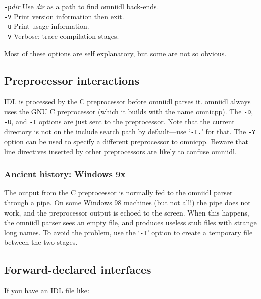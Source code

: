 \documentclass[11pt,twoside,a4paper]{book}
\newcommand{\cmdline}[1]{\texttt{#1}}
\begin{document}
\begin{tabbing}
\cmdline{-p}\textit{dir}
     \> Use \textit{dir} as a path to find omniidl back-ends.\\

\cmdline{-V}
     \> Print version information then exit.\\

\cmdline{-u}
     \> Print usage information.\\

\cmdline{-v}
     \> Verbose: trace compilation stages.\\

\end{tabbing}

\noindent Most of these options are self explanatory, but some are not
so obvious.

\subsection{Preprocessor interactions}

IDL is processed by the C preprocessor before omniidl parses it.
omniidl always uses the GNU C preprocessor (which it builds with the
name omnicpp). The \cmdline{-D}, \cmdline{-U}, and \cmdline{-I}
options are just sent to the preprocessor. Note that the current
directory is not on the include search path by default---use
`\cmdline{-I.}' for that. The \cmdline{-Y} option can be used to
specify a different preprocessor to omnicpp. Beware that line
directives inserted by other preprocessors are likely to confuse
omniidl.

\subsubsection{Ancient history: Windows 9x}

The output from the C preprocessor is normally fed to the omniidl
parser through a pipe. On some Windows 98 machines (but not all!)  the
pipe does not work, and the preprocessor output is echoed to the
screen. When this happens, the omniidl parser sees an empty file, and
produces useless stub files with strange long names. To avoid the
problem, use the `\cmdline{-T}' option to create a temporary file
between the two stages.


\subsection{Forward-declared interfaces}

If you have an IDL file like:
\end{document}
